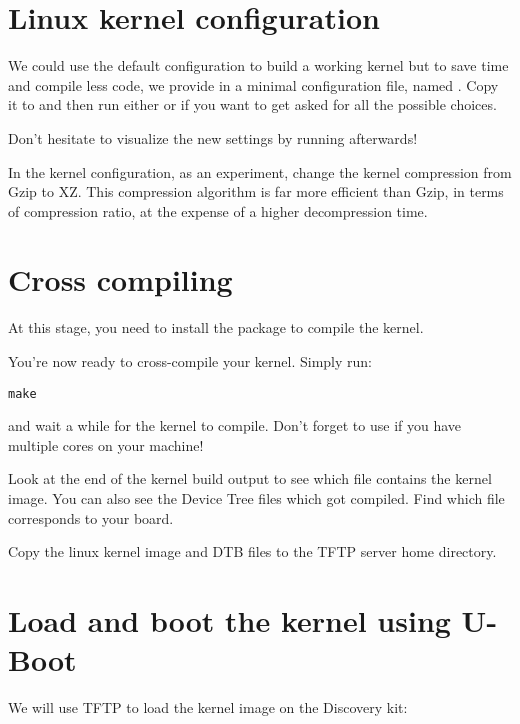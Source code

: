 \section{Linux kernel configuration}

We could use the  default configuration to
build a working kernel but to save time and compile less code, we
provide in
 a minimal configuration
file, named . Copy it to  and
then run either  or  if
you want to get asked for all the possible choices.

Don't hesitate to visualize the new settings by running
 afterwards!

In the kernel configuration, as an experiment, change the kernel
compression from Gzip to XZ. This compression algorithm is far more
efficient than Gzip, in terms of compression ratio, at the expense of
a higher decompression time.

\section{Cross compiling}

At this stage, you need to install the 
package to compile the kernel.

You're now ready to cross-compile your kernel. Simply run:

\begin{verbatim}
make
\end{verbatim}

and wait a while for the kernel to compile. Don't forget to use
 if you have multiple cores on your machine!

Look at the end of the kernel build output to see which file contains
the kernel image. You can also see the Device Tree  files
which got compiled. Find which  file corresponds to your
board.

Copy the linux kernel image and DTB files to the TFTP server 
home directory.

\section{Load and boot the kernel using U-Boot}

We will use TFTP to load the kernel image on the Discovery kit:

